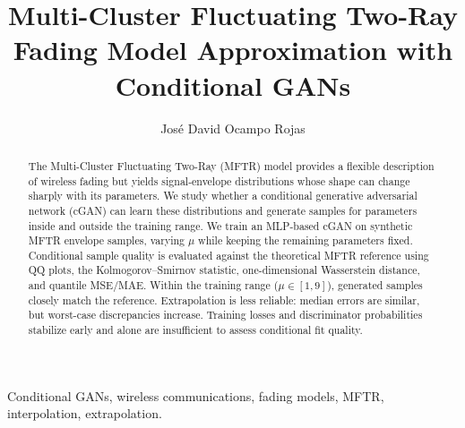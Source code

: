 \title{Multi-Cluster Fluctuating Two-Ray Fading Model Approximation with Conditional GANs}
\author{José David Ocampo Rojas}
\fontsize{10}{12}\selectfont
\maketitle
\begin{abstract}
    The Multi-Cluster Fluctuating Two-Ray (MFTR) model provides a flexible description of wireless fading but yields signal-envelope distributions whose shape can change sharply with its parameters. We study whether a conditional generative adversarial network (cGAN) can learn these distributions and generate samples for parameters inside and outside the training range. We train an MLP-based cGAN on synthetic MFTR envelope samples, varying $\mu$ while keeping the remaining parameters fixed. Conditional sample quality is evaluated against the theoretical MFTR reference using QQ plots, the Kolmogorov--Smirnov statistic, one-dimensional Wasserstein distance, and quantile MSE/MAE. Within the training range ($\mu\in[1,9]$), generated samples closely match the reference. Extrapolation is less reliable: median errors are similar, but worst-case discrepancies increase. Training losses and discriminator probabilities stabilize early and alone are insufficient to assess conditional fit quality.
\end{abstract}
\begin{IEEEkeywords}
    Conditional GANs, wireless communications, fading models, MFTR, interpolation, extrapolation.
\end{IEEEkeywords}
\IEEEpeerreviewmaketitle
